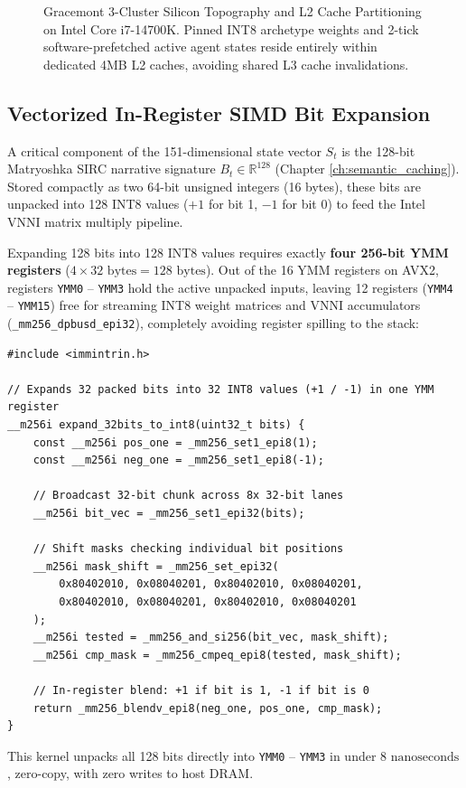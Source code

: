 \begin{figure}[htbp]
\caption{Gracemont 3-Cluster Silicon Topography and L2 Cache Partitioning on Intel Core i7-14700K. Pinned INT8 archetype weights and 2-tick software-prefetched active agent states reside entirely within dedicated 4MB L2 caches, avoiding shared L3 cache invalidations.}
\label{fig:gracemont_l2_cluster_topology}
\end{figure}

\subsection{Vectorized In-Register SIMD Bit Expansion}

A critical component of the 151-dimensional state vector $S_t$ is the 128-bit Matryoshka SIRC narrative signature $B_t \in \mathbb{R}^{128}$ (Chapter \ref{ch:semantic_caching}). Stored compactly as two 64-bit unsigned integers (16 bytes), these bits are unpacked into 128 INT8 values ($+1$ for bit 1, $-1$ for bit 0) to feed the Intel VNNI matrix multiply pipeline.

Expanding 128 bits into 128 INT8 values requires exactly \textbf{four 256-bit YMM registers} ($4 \times 32\text{ bytes} = 128\text{ bytes}$). Out of the 16 YMM registers on AVX2, registers \texttt{YMM0} -- \texttt{YMM3} hold the active unpacked inputs, leaving 12 registers (\texttt{YMM4} -- \texttt{YMM15}) free for streaming INT8 weight matrices and VNNI accumulators (\texttt{\_mm256\_dpbusd\_epi32}), completely avoiding register spilling to the stack:

\begin{listing}[htbp]
\caption{AVX2 In-Register Bit Expansion of 128-bit SIRC Signatures to INT8.}
\label{listing:avx2_bit_expansion}
\begin{verbatim}
#include <immintrin.h>

// Expands 32 packed bits into 32 INT8 values (+1 / -1) in one YMM register
__m256i expand_32bits_to_int8(uint32_t bits) {
    const __m256i pos_one = _mm256_set1_epi8(1);
    const __m256i neg_one = _mm256_set1_epi8(-1);
    
    // Broadcast 32-bit chunk across 8x 32-bit lanes
    __m256i bit_vec = _mm256_set1_epi32(bits);
    
    // Shift masks checking individual bit positions
    __m256i mask_shift = _mm256_set_epi32(
        0x80402010, 0x08040201, 0x80402010, 0x08040201,
        0x80402010, 0x08040201, 0x80402010, 0x08040201
    );
    __m256i tested = _mm256_and_si256(bit_vec, mask_shift);
    __m256i cmp_mask = _mm256_cmpeq_epi8(tested, mask_shift);
    
    // In-register blend: +1 if bit is 1, -1 if bit is 0
    return _mm256_blendv_epi8(neg_one, pos_one, cmp_mask);
}
\end{verbatim}
\end{listing}

This kernel unpacks all 128 bits directly into \texttt{YMM0} -- \texttt{YMM3} in under $8\text{ nanoseconds}$, zero-copy, with zero writes to host DRAM.
